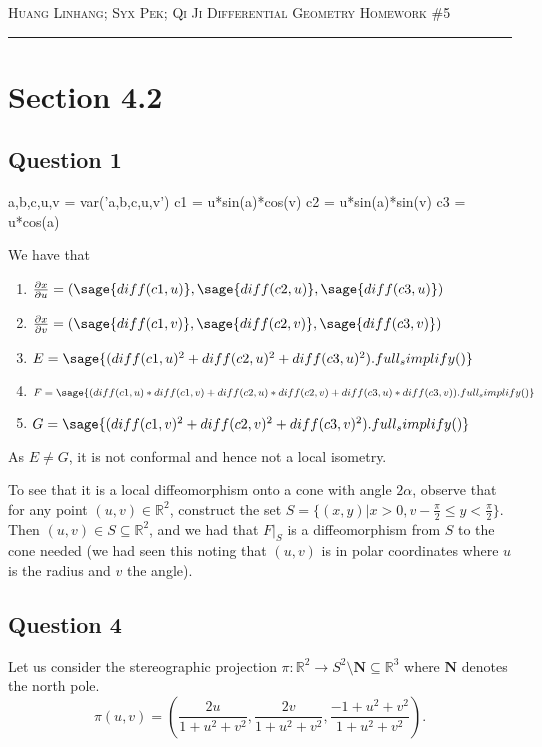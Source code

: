\documentclass[12pt]{article}
\begin{document}
\thispagestyle{empty}

{\scshape Huang Linhang; Syx Pek; Qi Ji} \hfill {\scshape \large Differential Geometry} \hfill {\scshape Homework \#5}

\smallskip
\hrule
\bigskip
\section{Section 4.2}

\subsection*{Question 1}


\begin{sagesilent}
    a,b,c,u,v = var('a,b,c,u,v')
    c1 = u*sin(a)*cos(v)
    c2 = u*sin(a)*sin(v)
    c3 = u*cos(a)
\end{sagesilent}

We have that
\begin{enumerate}
\item $\frac{ \partial x}{\partial u} = (\sage{diff(c1,u)}, \sage{diff(c2, u)}, \sage{diff(c3,u)})$ 
\item $\frac{ \partial x}{\partial v} = (\sage{diff(c1,v)}, \sage{diff(c2, v)}, \sage{diff(c3,v)})$
\item $E = \sage{(diff(c1,u)^2 + diff(c2,u)^2 + diff(c3,u)^2).full_simplify()}$
\item $F = \sage{(diff(c1,u)*diff(c1,v) + diff(c2,u)*diff(c2,v) + diff(c3,u)*diff(c3,v)).full_simplify()}$ 
\item $G = \sage{(diff(c1,v)^2 + diff(c2,v)^2 + diff(c3,v)^2).full_simplify()}$
\end{enumerate}

As $E \neq G$, it is not conformal and hence not a local isometry.

To see that it is a local diffeomorphism onto a cone with angle $2\alpha$, observe that for any point $(u, v) \in \mathbb R^2$, construct the set $S = \{(x, y)| x > 0, v-\frac\pi2 \leq y < \frac\pi2\}$. Then $(u, v) \in S \subseteq \mathbb R^2$, and we had that $F|_S$ is a diffeomorphism from $S$ to the cone needed (we had seen this noting that $(u,v)$ is in polar coordinates where $u$ is the radius and $v$ the angle).


\subsection*{Question 4}

Let us consider the stereographic projection $\pi: \mathbb R^2 \to S^2 \setminus{\textbf{N}} \subseteq \mathbb R^3$ where $\textbf{N}$ denotes the north pole.
$$\pi(u, v) = \left(\frac{2u}{1 + u^2 + v^2}, \frac{2v}{1 + u^2 + v^2}, \frac{-1 + u^2 + v^2}{1 + u^2 + v^2} \right).$$
\end{document}
